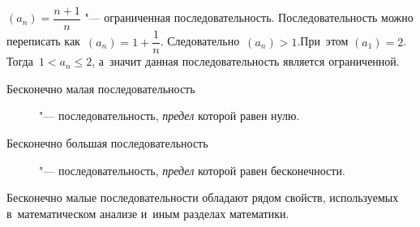 \documentclass[]{scrartcl}
\begin{document}
\begin{Thexmpl}\label{ex:limited-sequence}
${\displaystyle (a_n)=\dfrac{n+1}{n}}$ "--- ограниченная последовательность. Последовательность можно переписать как~${\displaystyle (a_n)=1+\dfrac{1}{n}}$. Следовательно~${\displaystyle (a_n)>1}$.При~этом ${\displaystyle (a_1)=2}$. Тогда~${\displaystyle 1 < a_n \leq 2}$, а~значит данная последовательность является ограниченной.
\end{Thexmpl}

\begin{description}
	\item[Бесконечно малая последовательность] "--- последовательность, \emph{предел} которой равен нулю.
	\item[Бесконечно большая последовательность] "--- последовательность, \emph{предел} которой равен бесконечности.
\end{description}
Бесконечно малые последовательности обладают рядом свойств, используемых в~математическом анализе и~иным разделах математики.
\end{document}
